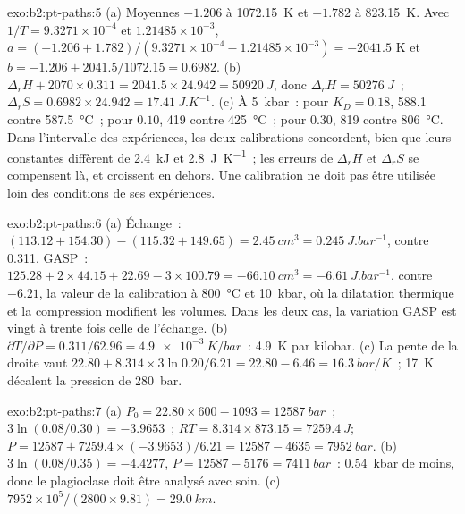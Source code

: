 \begin{solution}{exo:b2:pt-paths:5}
(a) Moyennes $-1.206$ à \qty{1072.15}{K} et $-1.782$ à \qty{823.15}{K}. Avec $1/T =
9.3271\times10^{-4}$ et $1.21485\times10^{-3}$, $a = (-1.206 + 1.782)/(9.3271\times10^{-4}
- 1.21485\times10^{-3}) = -2041.5$ K et $b = -1.206 + 2041.5/1072.15 = 0.6982$.
(b) $\Delta_r H + 2070\times0.311 = 2041.5\times24.942 = \qty{50920}{J}$, donc $\Delta_r H =
\qty{50276}{J}$~; $\Delta_r S = 0.6982\times24.942 = \qty{17.41}{J.K^{-1}}$. (c) À
\qty{5}{kbar}~: pour $K_D = 0.18$, 588.1 contre \qty{587.5}{\celsius}~; pour $0.10$, 419
contre \qty{425}{\celsius}~; pour $0.30$, 819 contre \qty{806}{\celsius}. Dans l'intervalle
des expériences, les deux calibrations concordent, bien que leurs constantes diffèrent de
\qty{2.4}{kJ} et \qty{2.8}{J.K^{-1}}~; les erreurs de $\Delta_r H$ et $\Delta_r S$
se compensent là, et croissent en dehors. Une calibration ne doit pas être utilisée loin
des conditions de ses expériences.
\end{solution}

\begin{solution}{exo:b2:pt-paths:6}
(a) Échange~: $(113.12 + 154.30) - (115.32 + 149.65) = \qty{+2.45}{cm^3} =
\qty{0.245}{J.bar^{-1}}$, contre 0.311. GASP~: $125.28 + 2\times44.15 + 22.69 -
3\times100.79 = \qty{-66.10}{cm^3} = \qty{-6.61}{J.bar^{-1}}$, contre $-6.21$, la valeur
de la calibration à \qty{800}{\celsius} et \qty{10}{kbar}, où la dilatation thermique et
la compression modifient les volumes. Dans les deux cas, la variation GASP est vingt à trente fois
celle de l'échange. (b) $\partial T/\partial P = 0.311/62.96 = \qty{4.9e-3}{K/bar}$~:
\qty{4.9}{K} par kilobar. (c) La pente de la droite vaut $22.80 + 8.314\times3\ln 0.20/6.21
= 22.80 - 6.46 = \qty{16.3}{bar/K}$~; \qty{17}{K} décalent la pression de
\qty{280}{bar}.
\end{solution}

\begin{solution}{exo:b2:pt-paths:7}
(a) $P_0 = 22.80\times600 - 1093 = \qty{12587}{bar}$~; $3\ln(0.08/0.30) = -3.9653$~; $RT =
8.314\times873.15 = \qty{7259.4}{J}$; $P = 12587 + 7259.4\times(-3.9653)/6.21 = 12587 -
4635 = \qty{7952}{bar}$. (b) $3\ln(0.08/0.35) = -4.4277$, $P = 12587 - 5176 =
\qty{7411}{bar}$~: \qty{0.54}{kbar} de moins, donc le plagioclase doit être analysé avec soin.
(c) $7952\times10^5/(2800\times9.81) = \qty{29.0}{km}$.
\end{solution}

